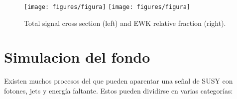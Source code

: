 \clearpage



\begin{figure}[ht!]
  \centering
  \texttt{[image: figures/figura]} %
  \texttt{[image: figures/figura]} %
  \caption{Total signal cross section (left) and EWK relative fraction (right).}
  \label{fig:signal_xs_total}
\end{figure}

\section{Simulacion del fondo}\label{sec:bkg_samples}

Existen muchos procesos del {\SM} que pueden aparentar
una señal de SUSY con fotones, jets y energía faltante.
Estos pueden dividirse en varias categorías:

